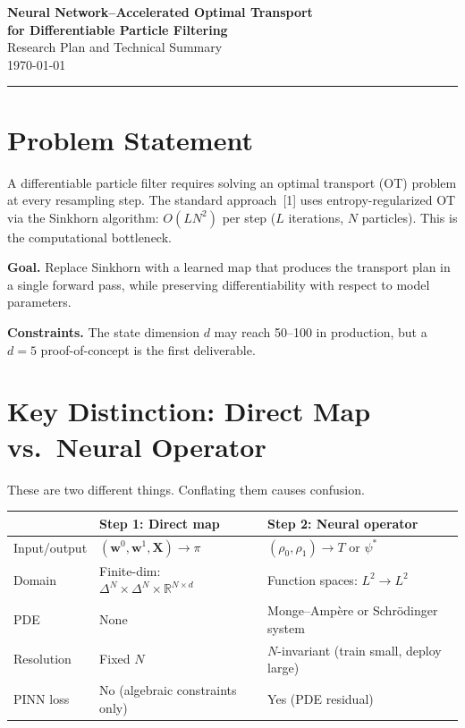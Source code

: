 \documentclass[11pt]{article}
\newcommand{\RR}{\mathbb{R}}
\newcommand{\bw}{\mathbf{w}}
\newcommand{\bX}{\mathbf{X}}
\begin{document}
\begin{center}
{\Large \textbf{Neural Network--Accelerated Optimal Transport\\[3pt] for Differentiable Particle Filtering}}\\[10pt]
{\normalsize Research Plan and Technical Summary}\\[4pt]
{\small \today}
\end{center}

\vspace{0.5em}
\hrule
\vspace{1em}

\section{Problem Statement}

A differentiable particle filter requires solving an optimal transport (OT) problem at every resampling step. The standard approach~[1] uses entropy-regularized OT via the Sinkhorn algorithm: $O(LN^2)$ per step ($L$ iterations, $N$ particles). This is the computational bottleneck.

\textbf{Goal.} Replace Sinkhorn with a learned map that produces the transport plan in a single forward pass, while preserving differentiability with respect to model parameters.

\textbf{Constraints.} The state dimension $d$ may reach 50--100 in production, but a $d=5$ proof-of-concept is the first deliverable.

\section{Key Distinction: Direct Map vs.\ Neural Operator}

These are two different things. Conflating them causes confusion.

\begin{center}
\begin{tabular}{@{}lll@{}}
\toprule
& \textbf{Step 1: Direct map} & \textbf{Step 2: Neural operator} \\
\midrule
Input/output & $(\bw^0, \bw^1, \bX) \to \pi$ & $(\rho_0, \rho_1) \to T$ or $\psi^*$ \\
Domain & Finite-dim: $\Delta^N \times \Delta^N \times \RR^{N \times d}$ & Function spaces: $L^2 \to L^2$ \\
PDE & None & Monge--Amp\`ere or Schr\"odinger system \\
Resolution & Fixed $N$ & $N$-invariant (train small, deploy large) \\
PINN loss & No (algebraic constraints only) & Yes (PDE residual) \\
\bottomrule
\end{tabular}
\end{center}
\end{document}

